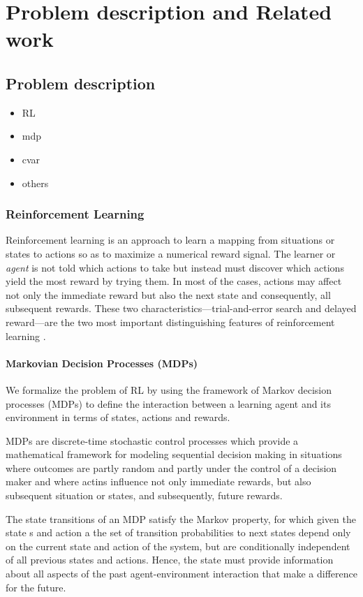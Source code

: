 \chapter{Problem description and Related work}
\label{sec:problem_description}
\section{Problem description}
\begin{itemize}
    \item RL
    \item mdp
    \item cvar
    \item others
\end{itemize}

\subsection{Reinforcement Learning}

Reinforcement learning is an approach to learn a mapping from situations or states to actions so as to maximize 
a numerical reward signal. The learner or \textit{agent} is not told which actions to take
but instead must discover which actions yield the most reward by trying them. In most of the cases,
actions may affect not only the immediate reward but also the next state and consequently, all subsequent rewards.
These two characteristics—trial-and-error search and delayed reward—are the two most important
distinguishing features of reinforcement learning \cite{Sutton1998}.

\subsubsection{Markovian Decision Processes (MDPs)}
We formalize the problem of RL by using the framework of Markov decision processes (MDPs)
to define the interaction between a learning agent and its environment in terms of states,
actions and rewards.

MDPs  are discrete-time stochastic control processes which provide a
mathematical framework for modeling sequential decision making in situations where outcomes are
partly random and partly under the control of a decision maker and where actins influence not only immediate rewards,
but also subsequent situation or states, and subsequently, future rewards.

The state transitions of an MDP 
satisfy the Markov property, for which given the state s and action a the set of transition
probabilities to next states depend only on the current state and action of the system,
but are conditionally independent of all previous states and actions. Hence, the state must provide information about 
all aspects of the past agent-environment interaction that make a difference for the future.

